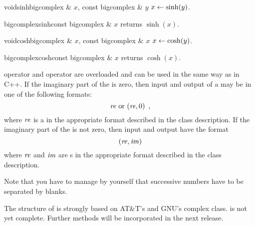 \begin{fcode}{void}{sinh}{bigcomplex & $x$, const bigcomplex & $y$}
  $x \leftarrow \sinh(y)$.
\end{fcode}

\begin{fcode}{bigcomplex}{sinh}{const bigcomplex & $x$}
  returns $\sinh(x)$.
\end{fcode}

\begin{fcode}{void}{cosh}{bigcomplex & $x$, const bigcomplex & $x$}
  $x \leftarrow \cosh(y)$.
\end{fcode}

\begin{fcode}{bigcomplex}{cosh}{const bigcomplex & $x$}
  returns $\cosh(x)$.
\end{fcode}



\IO

 operator \code{>>} and  operator \code{<<} are overloaded and can
be used in the same way as in C++.  If the imaginary part of the  is zero, then
input and output of a  may be in one of the following formats:
\begin{displaymath}
  \mathit{re} \text{ or } (\mathit{re},0) \enspace,
\end{displaymath}
where $\mathit{re}$ is a  in the appropriate format described in the 
class description.  If the imaginary part of the  is not zero, then input and
output have the format
\begin{displaymath}
  (\mathit{re}, \mathit{im})
\end{displaymath}
where $\mathit{re}$ and $\mathit{im}$ are s in the appropriate format described in the
 class description.

Note that you have to manage by yourself that successive  numbers have to be
separated by blanks.



\SEEALSO




\NOTES

The structure of  is strongly based on AT\&T's and GNU's complex class.
 is not yet complete.  Further methods will be incorporated in the next
release.


